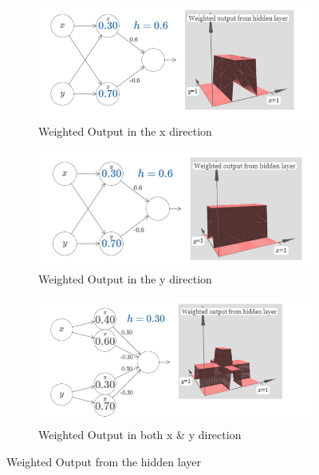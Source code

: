 \documentclass{article}
\begin{document}
\begin{figure}
    \centering
     \begin{subfigure}[b]{0.7\textwidth}
     \centering
         \includegraphics[width=\textwidth]{Images/2/14.png}
         \caption{Weighted Output in the x direction}
         \label{fig:x}
     \end{subfigure}
     \hfill
     \begin{subfigure}[b]{0.7\textwidth}
     \centering
         \includegraphics[width=\textwidth]{Images/2/15.png}
         \caption{Weighted Output in the y direction}
         \label{fig:y}
     \end{subfigure}
     \begin{subfigure}[b]{0.7\textwidth}
     \centering
         \includegraphics[width=\textwidth]{Images/2/16.png}
         \caption{Weighted Output in both x \& y direction}
         \label{fig:xy}
     \end{subfigure}
     \caption{Weighted Output from the hidden layer}
    \label{fig:figure15}
\end{figure}
\end{document}
